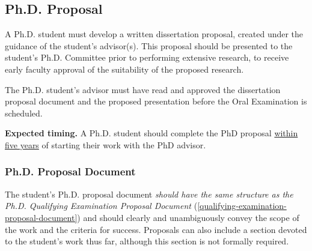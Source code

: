 


\hypertarget{phd-proposal}{
\subsection{Ph.D. Proposal}
\label{phd-proposal}
}

A Ph.D. student must develop a written dissertation proposal, created
under the guidance of the student's advisor(s). This proposal should be
presented to the student's Ph.D. Committee prior to performing extensive
research, to receive early faculty approval of the suitability of the
proposed research.

The Ph.D. student's advisor must have read and approved the dissertation
proposal document and the proposed presentation before the Oral
Examination is scheduled.


\noindent
\textbf{Expected timing.}
A Ph.D. student should complete the PhD proposal
\ul{within five years} of starting their work with the PhD advisor.

\hypertarget{phd-proposal-document}{%
\subsubsection{Ph.D. Proposal Document}\label{phd-proposal-document}}

The student's Ph.D. proposal document \emph{should have the same structure
as the Ph.D. Qualifying Examination Proposal Document} (\cref{qualifying-examination-proposal-document}) and
should clearly and unambiguously convey the scope of the work and the
criteria for success. Proposals can also include a section devoted to
the student's work thus far, although this section is not formally
required.


